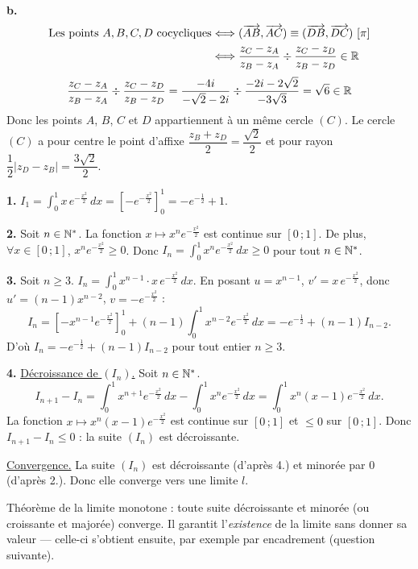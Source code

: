 \documentclass[11pt]{article}
\begin{document}
\textbf{b.}
\begin{align*}
\text{Les points } A, B, C, D \text{ cocycliques} &\Longleftrightarrow (\vv{AB}, \vv{AC}) \equiv (\vv{DB}, \vv{DC})\ [\pi] \\
&\Longleftrightarrow \frac{z_C - z_A}{z_B - z_A} \div \frac{z_C - z_D}{z_B - z_D} \in \R
\end{align*}
\[ \frac{z_C - z_A}{z_B - z_A} \div \frac{z_C - z_D}{z_B - z_D} = \frac{-4i}{-\sqrt{2} - 2i} \div \frac{-2i - 2\sqrt{2}}{-3\sqrt{3}} = \sqrt{6} \in \mathbb{R} \]
Donc les points $A$, $B$, $C$ et $D$ appartiennent à un même cercle $(C)$. Le cercle $(C)$ a pour centre le point d'affixe $\dfrac{z_B + z_D}{2} = \dfrac{\sqrt{2}}{2}$ et pour rayon $\dfrac{1}{2}|z_D - z_B| = \dfrac{3\sqrt{2}}{2}$.


\textbf{1.} $\displaystyle I_1 = \int_0^1 x\,e^{-\frac{x^2}{2}}\,dx = \left[-e^{-\frac{x^2}{2}}\right]_0^1 = -e^{-\frac{1}{2}} + 1$.

\textbf{2.} Soit $n \in \mathbb{N}^*$. La fonction $x \mapsto x^n e^{-\frac{x^2}{2}}$ est continue sur $[0\,;1]$. De plus, $\forall x \in [0\,;1]$, $x^n e^{-\frac{x^2}{2}} \ge 0$. Donc $I_n = \displaystyle\int_0^1 x^n e^{-\frac{x^2}{2}}\,dx \ge 0$ pour tout $n \in \mathbb{N}^*$.

\textbf{3.} Soit $n \ge 3$. $I_n = \displaystyle\int_0^1 x^{n-1} \cdot x\,e^{-\frac{x^2}{2}}\,dx$. En posant $u = x^{n-1}$, $v' = x\,e^{-\frac{x^2}{2}}$, donc $u' = (n-1)x^{n-2}$, $v = -e^{-\frac{x^2}{2}}$ :
\[ I_n = \left[-x^{n-1}e^{-\frac{x^2}{2}}\right]_0^1 + (n-1)\int_0^1 x^{n-2}e^{-\frac{x^2}{2}}\,dx = -e^{-\frac{1}{2}} + (n-1)I_{n-2}. \]
D'où $I_n = -e^{-\frac{1}{2}} + (n-1)I_{n-2}$ pour tout entier $n \ge 3$.

\textbf{4.} \underline{Décroissance de $(I_n)$.} Soit $n \in \mathbb{N}^*$.
\[ I_{n+1} - I_n = \int_0^1 x^{n+1}e^{-\frac{x^2}{2}}\,dx - \int_0^1 x^n e^{-\frac{x^2}{2}}\,dx = \int_0^1 x^n(x - 1)e^{-\frac{x^2}{2}}\,dx. \]
La fonction $x \mapsto x^n(x-1)e^{-\frac{x^2}{2}}$ est continue sur $[0\,;1]$ et $\le 0$ sur $[0\,;1]$. Donc $I_{n+1} - I_n \le 0$ : la suite $(I_n)$ est décroissante.

\underline{Convergence.} La suite $(I_n)$ est décroissante (d'après 4.) et minorée par 0 (d'après 2.). Donc elle converge vers une limite $l$.

\begin{rappel}
Théorème de la limite monotone : toute suite décroissante et minorée
(ou croissante et majorée) converge. Il garantit l'\emph{existence} de
la limite sans donner sa valeur — celle-ci s'obtient ensuite, par
exemple par encadrement (question suivante).
\end{rappel}
\end{document}
